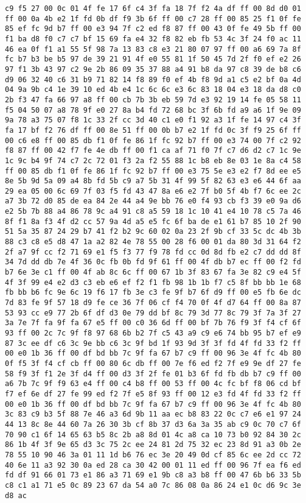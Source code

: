 \documentclass{article}
\begin{document}
\begin{verbatim}
c9 f5 27 00 0c 01 4f fe 17 6f c4 3f fa 18 7f f2 4a df ff 00 8d d0 01 ff 00 0a 4b e2 1f fd 0b df f9 3b 6f ff 00 c7 28 ff 00 85 25 f1 0f fe 85 ef fc 9d b7 ff 00 e3 94 7f c2 ed f8 87 ff 00 43 0f fe 49 5b ff 00 f1 ba d8 f0 c7 c7 bf 15 69 fa e4 32 f8 82 eb fb 53 4c 3f 24 f0 ac 11 46 ea 0f f1 a1 55 5f 98 7a 13 83 c8 e3 21 80 07 97 ff 00 a6 69 7a 8f fc b7 b3 be b5 97 de 39 21 91 4f e0 55 81 1f 50 45 7d 2f f0 ef e2 26 97 f1 3b 43 97 c2 9e 2b 86 09 35 37 88 a4 91 b8 da 97 c8 39 de b8 c6 d9 06 32 40 c6 31 b9 71 82 14 f8 89 f0 ef 4b f8 9d a1 c5 e2 bf 0a 4d 04 9a 9b c4 1e 39 10 ed 4b e4 1c 6c 6c e3 6c 83 18 04 e3 18 da d8 c0 2b f3 47 fa 66 97 a8 ff 00 cb 7b 3b eb 59 7d e3 92 19 14 fe 05 58 11 f5 04 50 07 a8 78 9f e0 27 8a b4 fd 72 68 bc 3f 6b fd a9 a6 1f 9e 09 9a 78 a3 75 07 f8 1c 33 2f cc 3d 40 c1 e0 f1 92 a3 1f fe 14 97 c4 3f fa 17 bf f2 76 df ff 00 8e 51 ff 00 0b b7 e2 1f fd 0c 3f f9 25 6f ff 00 c6 e8 ff 00 85 db f1 0f fe 86 1f fc 92 b7 ff 00 e3 74 00 7f c2 92 f8 87 ff 00 42 f7 fe 4e db ff 00 f1 ca af 71 f0 7f c7 d6 d2 c7 1c 9e 1c 9c b4 9f 74 c7 2c 72 01 f3 2a f2 55 88 1c b8 eb 8e 03 1e 8a c4 58 ff 00 85 db f1 0f fe 86 1f fc 92 b7 ff 00 e3 75 5e e3 e2 f7 8d ee e5 8e 5b 9d 5a 09 a4 8b fd 5b c9 a7 5b 31 4f 99 5f 82 63 e3 e6 44 6f aa 29 ea 05 00 6c 69 7f 03 f5 fd 43 47 8a e6 e2 7f b0 5f 4b f7 6c ee 2c a7 3b 72 d0 85 de ea 84 2e 44 a4 9e bb 76 e0 f4 93 cb f3 39 e0 9a d6 e2 5b 7b 88 a4 86 78 9c a4 91 c8 a5 59 18 1c 10 41 e4 10 78 c5 7a 46 8f f1 8a f3 4f d2 cc 57 9a 4d a5 e5 fc 6f ba de e1 61 b7 85 10 2f 90 51 5a 35 87 24 29 b7 41 f2 b2 9c 60 02 0a 23 2f 9b cf 33 5c dc 4b 3b 88 c3 c8 e5 d8 47 1a a2 82 4e 78 55 00 28 f6 00 01 da 80 3d 31 64 f2 2f a7 9f cc f2 71 69 e1 f5 f3 77 f9 78 fd cc 0d 8d fb e2 c7 dd dd 8f 34 7d dd db 7e 4f 36 0c fb 0b fd 9f 61 ff 00 4f db b7 ec ff 00 f2 fd b7 6e 3e c1 ff 00 4f ab 8c 6c ff 00 67 1b 3f 83 67 fa 3e 82 c9 e4 5f 4f 3f 99 e4 e2 d3 c3 eb e6 ef f2 f1 fb 98 1b 1b f7 c5 8f bb bb 1e 68 fb bb b6 fc 9e 6c 19 f6 17 fb 3e c3 fe 9f b7 6f d9 ff 00 e5 fb 6e dc 7d 83 fe 9f 57 18 d9 fe ce 36 7f 06 cf f4 70 0f 4f d7 64 ff 00 8a 87 53 93 cc e9 77 2b 6f df d3 0e 79 dd bf 8c 79 3d 77 8c 79 3f 7a 3f 27 3a 7e 7f fa 9f fa 67 e5 ff 00 c0 36 6d ff 00 bf 7b 76 f9 3f f4 cf 6f 93 ff 00 2c 7c 9f f8 97 68 6b b2 7f c5 43 a9 c9 e6 74 bb 95 b7 ef e9 87 3c ee df c6 3c 9e bb c6 3c 9f bd 1f 93 9d 3f 3f fd 4f fd 33 f2 ff 00 e0 1b 36 ff 00 df bd bb 7c 9f fa 67 b7 c9 ff 00 96 3e 4f fc 4b 80 0f f5 3f f4 cf cb ff 00 80 6c db ff 00 7e f6 ed f2 7f e9 9e df 27 fe 58 f9 3f f1 2e 3f d4 ff 00 d3 3f 2f fe 01 b3 6f fd fb db b7 c9 ff 00 a6 7b 7c 9f f9 63 e4 ff 00 c4 b8 ff 00 53 ff 00 4c fc bf f8 06 cd bf f7 ef 6e df 27 fe 99 ed f2 7f e5 8f 93 ff 00 12 e3 fd 4f fd 33 f2 ff 00 e0 1b 36 ff 00 df bd bb 7c 9f fa 67 b7 c9 ff 00 96 3e 4f fc 4b 80 3c 83 c9 b3 5f 88 7e 46 a3 6d 9b 11 aa ec b8 83 22 0c c7 e6 e1 97 24 44 13 8c 8e 44 60 7a 26 30 3b cf 8b 37 d3 6a 3a 35 ab c9 0c 70 c7 6f 70 90 c1 6f 14 65 63 b5 8c 2b a8 8d 01 4c a8 ca 10 73 b0 92 84 30 2c 86 1b 4f 3f 9e 65 d3 3c 75 2c ee 24 81 2d 75 32 ec 23 8d 91 a3 0b 2e 78 55 10 90 46 3a 01 11 1d b6 76 ec 3e 20 49 0d cf 85 6c ee 2d cc 72 40 6e 11 a3 92 30 0a ed 28 ca 30 42 00 01 11 ed ff 00 96 7f ea f6 ed fd df 91 66 01 73 e1 86 a3 71 69 e1 9b c8 a3 b8 ff 00 47 6b b6 33 5b c8 c1 a1 71 e5 0c 89 23 67 da 54 a0 7c 86 08 0a 86 24 e1 0c d6 9c 3e d8 ac 
\end{verbatim}
\end{document}
